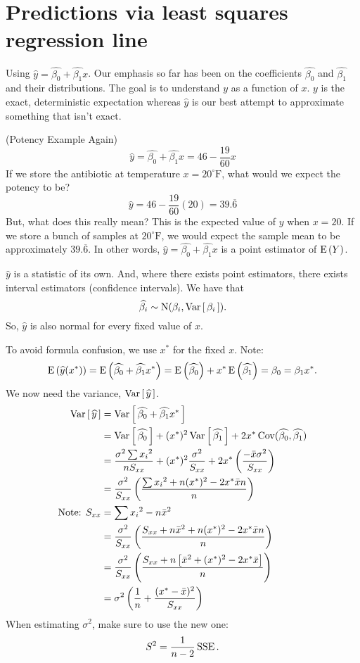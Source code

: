 \section{Predictions via least squares regression line}
Using $\widehat y = \widehat{\beta_0} + \widehat{\beta_1}x$. Our emphasis so far has been on the coefficients $\widehat{\beta_0}$ and $\widehat{\beta_1}$ and their distributions. The goal is to understand $y$ as a function of $x$. $y$ is the exact, deterministic expectation whereas $\widehat y$ is our best attempt to approximate something that isn't exact. 

\example (Potency Example Again)
$$\widehat y = \widehat{\beta_0} + \widehat{\beta_1}x = 46 - \dfrac{19}{60}x$$
If we store the antibiotic at temperature $x = 20^{\circ}\text{F}$, what would we expect the potency to be? 
$$\widehat y = 46 - \frac{19}{60}(20) = 39.\overline{6}$$
But, what does this really mean? This is the expected value of $y$ when $x = 20$. If we store a bunch of samples at $20^{\circ} \text{F}$, we would expect the sample mean to be approximately $39.\overline6$. In other words, $\widehat y = \widehat{\beta_0} + \widehat{\beta_1}x$ is a point estimator of $\E{Y}$.

\nl $\widehat y$ is a statistic of its own. And, where there exists point estimators, there exists interval estimators (confidence intervals). We have that 
$$\widehat{\beta_i} \sim \operatorname{N}(\beta_i, \Varb{\beta_i}).$$
So, $\widehat y$ is also normal for every fixed value of $x$. 

\nl To avoid formula confusion, we use $x^*$ for the fixed $x$. Note:
$$\E{\widehat y (x^*)} = \E{\widehat{\beta_0} + \widehat{\beta_1}x^*} = \E{\widehat{\beta_0}} + x^* \E{\widehat{\beta_1}} = \beta_0 = \beta_1 x^*.$$
We now need the variance, $\Varb{\widehat y}$.
\begin{align*}
    \Varb{\widehat y} &= \Varb{\widehat{\beta_0} + \widehat{\beta_1}x^*}\\
    &= \Varb{\widehat{\beta_0}} + (x^*)^2 \Varb{\widehat{\beta_1}} + 2x^* \Cov (\widehat{\beta_0}, \widehat{\beta_1})\\
    &= \frac{\sigma^2 \sum {x_i}^2}{n S_{xx}} + (x^*)^2 \frac{\sigma^2}{S_{xx}} + 2x^* \pfrac*{-\bar x \sigma^2}{S_{xx}}\\
    &= \frac{\sigma^2}{S_{xx}} \pfrac*{\sum {x_i}^2 + n(x^*)^2 - 2x^* \bar x n}{n}\\
    \text{Note: $S_{xx}$} &= \text{$\sum {x_i}^2 - n\bar x^2$}\\
    &= \frac{\sigma^2}{S_{xx}} \pfrac*{S_{xx} + n \bar x^2 + n(x^*)^2 - 2x^* \bar x n}{n}\\
    &= \frac{\sigma^2}{S_{xx}} \pfrac*{S_{xx} + n \brac{\bar x^2 + (x^*)^2 - 2x^* \bar x}}{n}\\
    &= \sigma^2 \pars{\over n + \dfrac{(x^* - \bar x)^2}{S_{xx}}}
\end{align*}
When estimating $\sigma^2$, make sure to use the new one:
$$S^2 = \over{n-2} \operatorname{SSE}.$$

